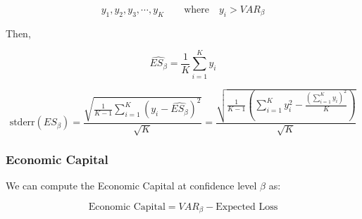 \documentclass[a4paper,12pt,final]{article}
\begin{document}
\begin{displaymath}
y_1, y_2, y_3, \cdots, y_K \qquad \textrm{where} \quad y_i > VAR_{\beta}
\end{displaymath}

Then,

\begin{displaymath}
\widehat{ES_{\beta}} = \frac{1}{K} \sum_{i=1}^{K} y_i
\end{displaymath}

\begin{displaymath}
\textrm{stderr}(ES_{\beta}) =
\frac{\sqrt{\frac{1}{K-1} \sum_{i=1}^{K} \left( y_i - \widehat{ES_{\beta}} \right)^2}}{\sqrt{K}} =
\frac{\sqrt{\frac{1}{K-1} \left( \sum_{i=1}^{K} y_i^2 - \frac{\left(\sum_{i=1}^{K} y_i \right)^2}{K} \right)}}{\sqrt{K}}
\end{displaymath}

\subsubsection{Economic Capital}
We can compute the Economic Capital at confidence level $\beta$ as:

\begin{displaymath}
\textrm{Economic Capital} = VAR_{\beta} - \textrm{Expected Loss}
\end{displaymath}

\end{document}
